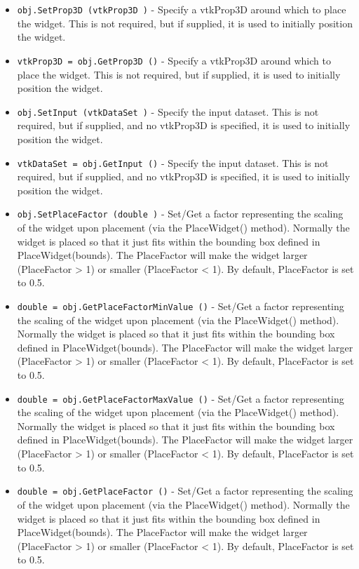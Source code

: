 \begin{itemize}
\item  \verb|obj.SetProp3D (vtkProp3D )| -  Specify a vtkProp3D around which to place the widget. This 
 is not required, but if supplied, it is used to initially 
 position the widget.

\item  \verb|vtkProp3D = obj.GetProp3D ()| -  Specify a vtkProp3D around which to place the widget. This 
 is not required, but if supplied, it is used to initially 
 position the widget.

\item  \verb|obj.SetInput (vtkDataSet )| -  Specify the input dataset. This is not required, but if supplied,
 and no vtkProp3D is specified, it is used to initially position 
 the widget.

\item  \verb|vtkDataSet = obj.GetInput ()| -  Specify the input dataset. This is not required, but if supplied,
 and no vtkProp3D is specified, it is used to initially position 
 the widget.

\item  \verb|obj.SetPlaceFactor (double )| -  Set/Get a factor representing the scaling of the widget upon placement
 (via the PlaceWidget() method). Normally the widget is placed so that
 it just fits within the bounding box defined in PlaceWidget(bounds).
 The PlaceFactor will make the widget larger (PlaceFactor > 1) or smaller
 (PlaceFactor < 1). By default, PlaceFactor is set to 0.5.

\item  \verb|double = obj.GetPlaceFactorMinValue ()| -  Set/Get a factor representing the scaling of the widget upon placement
 (via the PlaceWidget() method). Normally the widget is placed so that
 it just fits within the bounding box defined in PlaceWidget(bounds).
 The PlaceFactor will make the widget larger (PlaceFactor > 1) or smaller
 (PlaceFactor < 1). By default, PlaceFactor is set to 0.5.

\item  \verb|double = obj.GetPlaceFactorMaxValue ()| -  Set/Get a factor representing the scaling of the widget upon placement
 (via the PlaceWidget() method). Normally the widget is placed so that
 it just fits within the bounding box defined in PlaceWidget(bounds).
 The PlaceFactor will make the widget larger (PlaceFactor > 1) or smaller
 (PlaceFactor < 1). By default, PlaceFactor is set to 0.5.

\item  \verb|double = obj.GetPlaceFactor ()| -  Set/Get a factor representing the scaling of the widget upon placement
 (via the PlaceWidget() method). Normally the widget is placed so that
 it just fits within the bounding box defined in PlaceWidget(bounds).
 The PlaceFactor will make the widget larger (PlaceFactor > 1) or smaller
 (PlaceFactor < 1). By default, PlaceFactor is set to 0.5.


\end{itemize}
